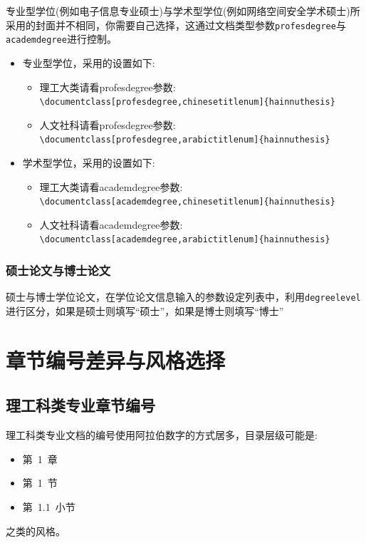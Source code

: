 专业型学位(例如电子信息专业硕士)与学术型学位(例如网络空间安全学术硕士)所采用的封面并不相同，你需要自己选择，这通过文档类型参数\lstinline|profesdegree|与\lstinline|academdegree|进行控制。
\begin{itemize}
\item 专业型学位，采用的设置如下:
	\begin{itemize}
	\item 理工大类请看profesdegree参数:\\
	  \lstinline|\documentclass[profesdegree,chinesetitlenum]{hainnuthesis}|
	\item 人文社科请看profesdegree参数:\\
	 \lstinline|\documentclass[profesdegree,arabictitlenum]{hainnuthesis}|
	\end{itemize} 
\item 学术型学位，采用的设置如下:
	\begin{itemize}
	\item 理工大类请看academdegree参数:\\
	 \lstinline|\documentclass[academdegree,chinesetitlenum]{hainnuthesis}|
	\item 人文社科请看academdegree参数:\\
	 \lstinline|\documentclass[academdegree,arabictitlenum]{hainnuthesis}|
	\end{itemize} 
\end{itemize}

\subsubsection{硕士论文与博士论文}
硕士与博士学位论文，在学位论文信息输入的参数设定列表中，利用\lstinline|degreelevel|
进行区分，如果是硕士则填写“硕士”，如果是博士则填写“博士” 


\section{章节编号差异与风格选择}

\subsection{理工科类专业章节编号}

理工科类专业文档的编号使用阿拉伯数字的方式居多，目录层级可能是: 
\begin{itemize}
\item 第~1~章
\item \quad 第~1~节
\item \qquad 第~1.1~小节
\end{itemize}
之类的风格。


